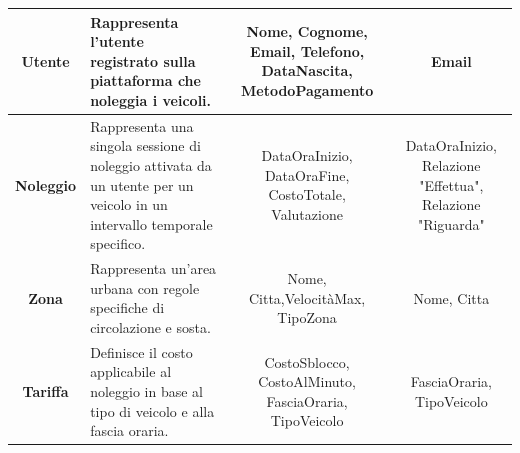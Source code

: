 \documentclass[11pt,a4paper]{article}
\begin{document}
\begin{tabularx}{\linewidth}{| C{0.85} | L{1.10} | C{0.95} | C{0.90} |}
    \textbf{Utente}                                                                                                         &
    Rappresenta l'utente registrato sulla \newline piattaforma che \newline noleggia i veicoli.                             &
    Nome, Cognome, Email, Telefono, DataNascita, MetodoPagamento                                                            &
    Email                                                                                                                                                                                         \\ \hline

    \textbf{Noleggio}                                                                                                       &
    Rappresenta una singola sessione di noleggio attivata da un utente per un veicolo in un intervallo temporale specifico. &
    DataOraInizio, DataOraFine, CostoTotale, Valutazione                                                                    &
    DataOraInizio, Relazione "Effettua", Relazione "Riguarda"                                                                                                                                     \\ \hline

    \textbf{Zona}                                                                                                           &
    Rappresenta un'area urbana con regole specifiche di circolazione e sosta.                                               &
    Nome, Citta,\newline VelocitàMax, TipoZona                                                               &
    Nome, Citta                                                                                                                                                                                   \\ \hline

    \textbf{Tariffa}                                                                                                        &
    Definisce il costo applicabile al noleggio in base al tipo di veicolo e alla fascia oraria.                             &
    CostoSblocco, CostoAlMinuto, FasciaOraria, TipoVeicolo                                                                  &
    FasciaOraria, TipoVeicolo                                                                                                                                                                     \\ \hline


\end{tabularx}
\end{document}
